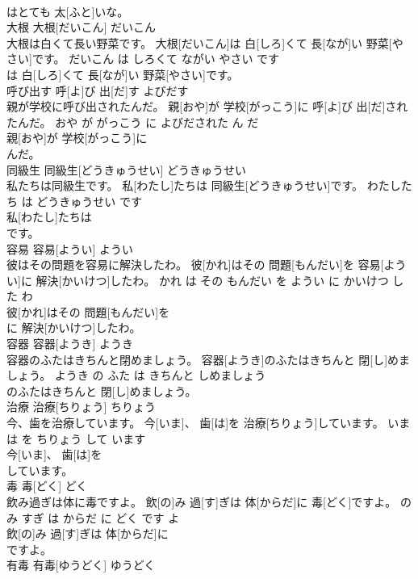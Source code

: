 \documentclass[8pt]{extreport}
\begin{document}
\begin{CJK}{UTF8}{min}
\\	はとても 太[ふと]いな。			
\\	大根	大根[だいこん]	だいこん	
\\	大根は白くて長い野菜です。	大根[だいこん]は 白[しろ]くて 長[なが]い 野菜[やさい]です。	だいこん は しろくて ながい やさい です	
\\	は 白[しろ]くて 長[なが]い 野菜[やさい]です。			
\\	呼び出す	呼[よ]び 出[だ]す	よびだす	
\\	親が学校に呼び出されたんだ。	親[おや]が 学校[がっこう]に 呼[よ]び 出[だ]されたんだ。	おや が がっこう に よびだされた ん だ	
\\	親[おや]が 学校[がっこう]に
\\	んだ。			
\\	同級生	同級生[どうきゅうせい]	どうきゅうせい	
\\	私たちは同級生です。	私[わたし]たちは 同級生[どうきゅうせい]です。	わたしたち は どうきゅうせい です	
\\	私[わたし]たちは
\\	です。			
\\	容易	容易[ようい]	ようい	
\\	彼はその問題を容易に解決したわ。	彼[かれ]はその 問題[もんだい]を 容易[ようい]に 解決[かいけつ]したわ。	かれ は その もんだい を ようい に かいけつ した わ	
\\	彼[かれ]はその 問題[もんだい]を
\\	に 解決[かいけつ]したわ。			
\\	容器	容器[ようき]	ようき	
\\	容器のふたはきちんと閉めましょう。	容器[ようき]のふたはきちんと 閉[し]めましょう。	ようき の ふた は きちんと しめましょう	
\\	のふたはきちんと 閉[し]めましょう。			
\\	治療	治療[ちりょう]	ちりょう	
\\	今、歯を治療しています。	今[いま]、 歯[は]を 治療[ちりょう]しています。	いま は を ちりょう して います	
\\	今[いま]、 歯[は]を
\\	しています。			
\\	毒	毒[どく]	どく	
\\	飲み過ぎは体に毒ですよ。	飲[の]み 過[す]ぎは 体[からだ]に 毒[どく]ですよ。	のみ すぎ は からだ に どく です よ	
\\	飲[の]み 過[す]ぎは 体[からだ]に
\\	ですよ。			
\\	有毒	有毒[ゆうどく]	ゆうどく	

\end{CJK}
\end{document}
